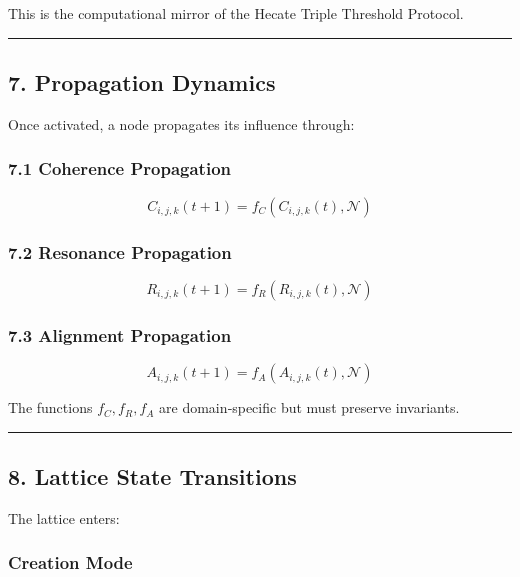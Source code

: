 This is the computational mirror of the Hecate Triple Threshold Protocol.

\begin{center}\rule{0.5\linewidth}{0.5pt}\end{center}

\subsection{7. Propagation Dynamics}\label{propagation-dynamics}

Once activated, a node propagates its influence through:

\subsubsection{7.1 Coherence Propagation}\label{coherence-propagation}

\[
C_{i,j,k}(t+1) = f_C(C_{i,j,k}(t), \mathcal{N})
\]

\subsubsection{7.2 Resonance Propagation}\label{resonance-propagation}

\[
R_{i,j,k}(t+1) = f_R(R_{i,j,k}(t), \mathcal{N})
\]

\subsubsection{7.3 Alignment Propagation}\label{alignment-propagation}

\[
A_{i,j,k}(t+1) = f_A(A_{i,j,k}(t), \mathcal{N})
\]

The functions \(f_C, f_R, f_A\) are domain‑specific but must preserve invariants.

\begin{center}\rule{0.5\linewidth}{0.5pt}\end{center}

\subsection{8. Lattice State Transitions}\label{lattice-state-transitions}

The lattice enters:

\subsubsection{Creation Mode}\label{creation-mode}

